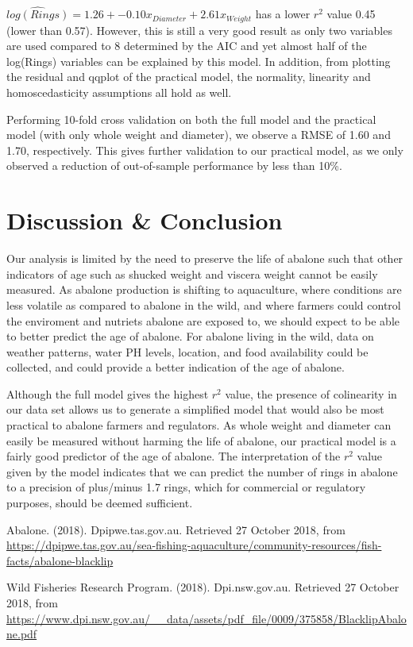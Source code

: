 \documentclass[10pt,twocolumn]{article}
\begin{document}
		$\hat{log(Rings)} = 1.26 +  -0.10 x_{Diameter} + 2.61 x_{Weight}$ has a lower $r^2$ value 0.45 (lower than 0.57). However, this is still a very good result as only two variables are used compared to 8 determined by the AIC and yet almost half of the log(Rings) variables can be explained by this model. In addition, from plotting the residual and qqplot of the practical model, the normality, linearity and homoscedasticity assumptions all hold as well. 
		
		Performing 10-fold cross validation on both the full model and the practical model (with only whole weight and diameter), we observe a RMSE of 1.60 and 1.70, respectively. This gives further validation to our practical model, as we only observed a reduction of out-of-sample performance by less than 10\%. 
	
	\section{Discussion \& Conclusion}
	
		Our analysis is limited by the need to preserve the life of abalone such that other indicators of age such as shucked weight and viscera weight cannot be easily measured. As abalone production is shifting to aquaculture, where conditions are less volatile as compared to abalone in the wild, and where farmers could control the enviroment and nutriets abalone are exposed to, we should expect to be able to better predict the age of abalone. For abalone living in the wild, data on weather patterns, water PH levels, location, and food availability could be collected, and could provide a better indication of the age of abalone.
		
		Although the full model gives the highest $r^2$ value, the presence of colinearity in our data set allows us to generate a simplified model that would also be most practical to abalone farmers and regulators. As whole weight and diameter can easily be measured without harming the life of abalone, our practical model is a fairly good predictor of the age of abalone. The interpretation of the $r^2$ value given by the model indicates that we can predict the number of rings in abalone to a precision of plus/minus 1.7 rings, which for commercial or regulatory purposes, should be deemed sufficient.
		
	
	\begin{thebibliography}{9}
		Abalone. (2018). Dpipwe.tas.gov.au. Retrieved 27 October 2018, from \url{https://dpipwe.tas.gov.au/sea-fishing-aquaculture/community-resources/fish-facts/abalone-blacklip}
		
		Wild Fisheries Research Program. (2018). Dpi.nsw.gov.au. Retrieved 27 October 2018, from		\url{https://www.dpi.nsw.gov.au/__data/assets/pdf_file/0009/375858/BlacklipAbalone.pdf}
	\end{thebibliography}
\end{document}
